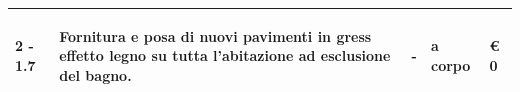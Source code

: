 \documentclass[a4paper]{article}
\begin{document}
\begin{tabular}{ | L{10mm} |  L{86mm} | L{12mm} | L{12mm} | L{16mm} | }
                            
                              \vspace{2.5mm}
                              \begin{spacing}{0}
                           2 - 1.7
                              \end{spacing} &
                              \vspace{2.5mm}
                              \begin{spacing}{0}
                           Fornitura e posa di nuovi pavimenti in gress effetto legno su tutta l'abitazione ad esclusione del bagno.
                              \end{spacing} &
                              \vspace{2.5mm}
                              \begin{spacing}{0}
                           -
                              \end{spacing} &
                              \vspace{2.5mm}
                              \begin{spacing}{0}
                           a corpo
                              \end{spacing} &
                              \vspace{2.5mm}
                              \begin{spacing}{0}
                                \euro\hfill 
                            0
                              \end{spacing} \\
                              \hline


\end{tabular}
\end{document}
